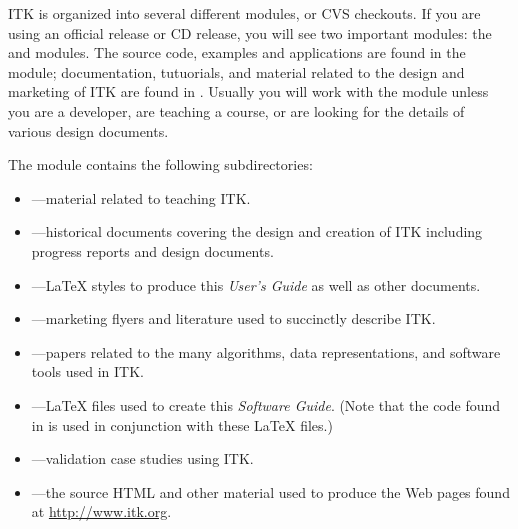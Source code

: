 ITK is organized into several different modules, or CVS checkouts. If you are
using an official release or CD release, you will see two important modules:
the  and  modules. The source code,
examples and applications are found in the  module;
documentation, tutuorials, and material related to the design and marketing
of ITK are found in . Usually you will work with the 
 module unless you are a developer, are teaching a course, or
are looking for the details of various design documents.

The  module contains the following subdirectories:
\begin{itemize}
        \item {}---material related to
        teaching ITK.
        \item {}---historical documents covering
        the design and creation of ITK including progress reports and 
        design documents.
        \item {}---\LaTeX{} styles to produce this
        \emph{User's Guide} as well as other documents.
        \item {}---marketing flyers and 
        literature used to succinctly describe ITK.
        \item {}---papers related to the many
        algorithms, data representations, and software tools used in ITK.
        \item {}---\LaTeX{} files used to
        create this \emph{Software Guide}. (Note that the code found in
         is used in conjunction with these \LaTeX{}
        files.)
        \item {}---validation case studies
        using ITK.
        \item {}---the source HTML and other material
        used to produce the Web pages found at \url{http://www.itk.org}.
\end{itemize}

